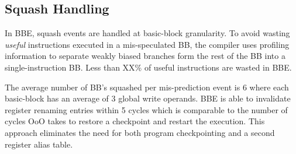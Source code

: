 \subsection{Squash Handling}
\label{sec:speculation}

In BBE, squash events are handled at basic-block granularity. To avoid wasting
{\it{useful}} instructions executed in a mis-speculated BB, the compiler uses
profiling information to separate weakly biased branches form the rest of the BB
into a single-instruction BB. Less than XX\% of useful instructions are wasted
in BBE.

The average number of BB's squashed per mis-prediction event is 6 where each
basic-block has an average of 3 global write operands. BBE is able to invalidate
register renaming entries within 5 cycles which is comparable to the number of
cycles OoO takes to restore a checkpoint and restart the execution. This
approach eliminates the need for both program checkpointing and a second
register alias table.




